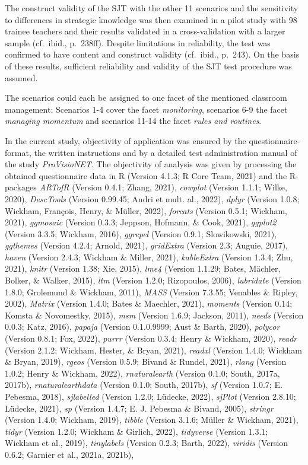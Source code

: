 \documentclass[
  man]{apa6}
\begin{document}
The construct validity of the SJT with the other 11 scenarios and the sensitivity to differences in strategic knowledge was then examined in a pilot study with 98 trainee teachers and their results validated in a cross-validation with a larger sample (cf.~ibid., p.~238ff). Despite limitations in reliability, the test was confirmed to have content and construct validity (cf.~ibid., p.~243). On the basis of these results, sufficient reliability and validity of the SJT test procedure was assumed.

The scenarios could each be assigned to one facet of the mentioned classroom management: Scenarios 1-4 cover the facet \emph{monitoring}, scenarios 6-9 the facet \emph{managing momentum} and scenarios 11-14 the facet \emph{rules and routines}.

In the current study, objectivity of application was ensured by the questionnaire-format, the written instructions and by a detailed test administration manual of the study \emph{ProVisioNET}. The objectivity of analysis was given by processing the obtained questionnaire data in R (Version 4.1.3; R Core Team, 2021) and the R-packages \emph{ARTofR} (Version 0.4.1; Zhang, 2021), \emph{cowplot} (Version 1.1.1; Wilke, 2020), \emph{DescTools} (Version 0.99.45; Andri et mult. al., 2022), \emph{dplyr} (Version 1.0.8; Wickham, François, Henry, \& Müller, 2022), \emph{forcats} (Version 0.5.1; Wickham, 2021), \emph{ggmosaic} (Version 0.3.3; Jeppson, Hofmann, \& Cook, 2021), \emph{ggplot2} (Version 3.3.5; Wickham, 2016), \emph{ggrepel} (Version 0.9.1; Slowikowski, 2021), \emph{ggthemes} (Version 4.2.4; Arnold, 2021), \emph{gridExtra} (Version 2.3; Auguie, 2017), \emph{haven} (Version 2.4.3; Wickham \& Miller, 2021), \emph{kableExtra} (Version 1.3.4; Zhu, 2021), \emph{knitr} (Version 1.38; Xie, 2015), \emph{lme4} (Version 1.1.29; Bates, Mächler, Bolker, \& Walker, 2015), \emph{ltm} (Version 1.2.0; Rizopoulos, 2006), \emph{lubridate} (Version 1.8.0; Grolemund \& Wickham, 2011), \emph{MASS} (Version 7.3.55; Venables \& Ripley, 2002), \emph{Matrix} (Version 1.4.0; Bates \& Maechler, 2021), \emph{moments} (Version 0.14; Komsta \& Novomestky, 2015), \emph{msm} (Version 1.6.9; Jackson, 2011), \emph{needs} (Version 0.0.3; Katz, 2016), \emph{papaja} (Version 0.1.0.9999; Aust \& Barth, 2020), \emph{polycor} (Version 0.8.1; Fox, 2022), \emph{purrr} (Version 0.3.4; Henry \& Wickham, 2020), \emph{readr} (Version 2.1.2; Wickham, Hester, \& Bryan, 2021), \emph{readxl} (Version 1.4.0; Wickham \& Bryan, 2019), \emph{rgeos} (Version 0.5.9; Bivand \& Rundel, 2021), \emph{rlang} (Version 1.0.2; Henry \& Wickham, 2022), \emph{rnaturalearth} (Version 0.1.0; South, 2017a, 2017b), \emph{rnaturalearthdata} (Version 0.1.0; South, 2017b), \emph{sf} (Version 1.0.7; E. Pebesma, 2018), \emph{sjlabelled} (Version 1.2.0; Lüdecke, 2022), \emph{sjPlot} (Version 2.8.10; Lüdecke, 2021), \emph{sp} (Version 1.4.7; E. J. Pebesma \& Bivand, 2005), \emph{stringr} (Version 1.4.0; Wickham, 2019), \emph{tibble} (Version 3.1.6; Müller \& Wickham, 2021), \emph{tidyr} (Version 1.2.0; Wickham \& Girlich, 2022), \emph{tidyverse} (Version 1.3.1; Wickham et al., 2019), \emph{tinylabels} (Version 0.2.3; Barth, 2022), \emph{viridis} (Version 0.6.2; Garnier et al., 2021a, 2021b), 
\end{document}
